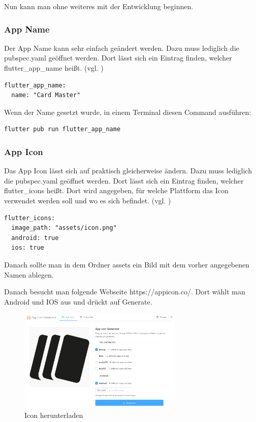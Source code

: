 Nun kann man ohne weiteres mit der Entwicklung beginnen.

\newpage


\subsubsection{App Name}
Der App Name kann sehr einfach geändert werden. Dazu muss lediglich die pubspec.yaml geöffnet werden. Dort lässt sich ein Eintrag finden, welcher flutter\_app\_name heißt. (vgl. \cite{AppName})

\vspace{0.5cm}
\begin{lstlisting}[style=flutterListingStyle,caption={App Name ändern}] 
flutter_app_name:
  name: "Card Master"
\end{lstlisting}

Wenn der Name gesetzt wurde, in einem Terminal diesen Command ausführen:
\vspace{0.5cm}
\begin{lstlisting}[style=flutterListingStyle,caption={App Name ändern},label={lst:appNameSetzen}] 
flutter pub run flutter_app_name
\end{lstlisting}

\newpage

\subsubsection{App Icon}
Das App Icon lässt sich auf praktisch gleicherweise ändern. Dazu muss lediglich die pubspec.yaml geöffnet werden. Dort lässt sich ein Eintrag finden, welcher flutter\_icons heißt. Dort wird angegeben, für welche Plattform das Icon verwendet werden soll und wo es sich befindet. (vgl. \cite{AppIcon})

\vspace{0.5cm}
\begin{lstlisting}[style=flutterListingStyle,caption={App Icon ändern},label={lst:appIcon}] 
flutter_icons:
  image_path: "assets/icon.png"
  android: true
  ios: true
\end{lstlisting}

Danach sollte man in dem Ordner assets ein Bild mit dem vorher angegebenen Namen ablegen. 

Danach besucht man folgende Webseite https://appicon.co/. Dort wählt man Android und IOS aus und drückt auf Generate. 
\begin{figure}[!h]
\centering
\includegraphics[width=0.7\textwidth]{FLUTTER/images/ZB/download_app_icon.png}
\caption{Icon herunterladen}
\end{figure}

